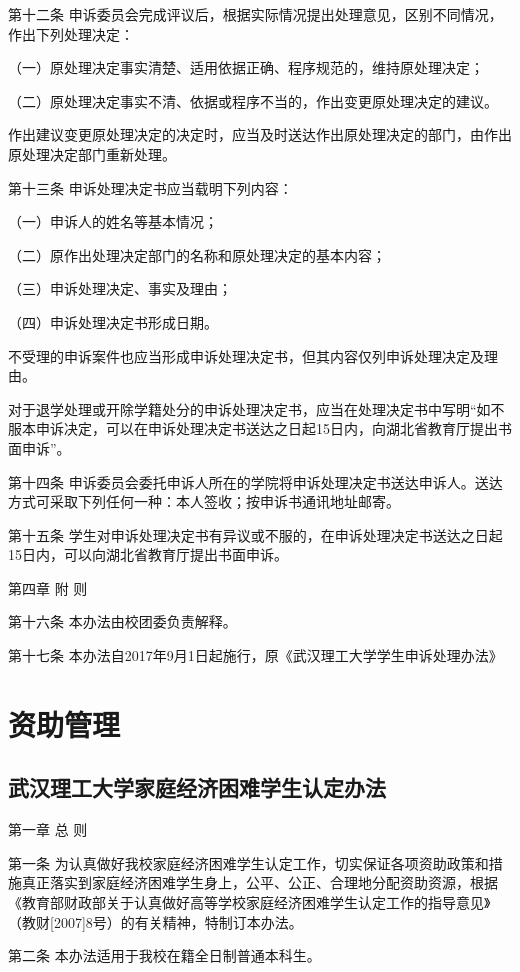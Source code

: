 \documentclass[UTF8,12pt,a4paper]{report}
\begin{document}
第十二条  申诉委员会完成评议后，根据实际情况提出处理意见，区别不同情况，作出下列处理决定：

（一）原处理决定事实清楚、适用依据正确、程序规范的，维持原处理决定；

（二）原处理决定事实不清、依据或程序不当的，作出变更原处理决定的建议。

作出建议变更原处理决定的决定时，应当及时送达作出原处理决定的部门，由作出原处理决定部门重新处理。

第十三条  申诉处理决定书应当载明下列内容：

（一）申诉人的姓名等基本情况；

（二）原作出处理决定部门的名称和原处理决定的基本内容；

（三）申诉处理决定、事实及理由；

（四）申诉处理决定书形成日期。

不受理的申诉案件也应当形成申诉处理决定书，但其内容仅列申诉处理决定及理由。

对于退学处理或开除学籍处分的申诉处理决定书，应当在处理决定书中写明“如不服本申诉决定，可以在申诉处理决定书送达之日起15日内，向湖北省教育厅提出书面申诉”。

第十四条  申诉委员会委托申诉人所在的学院将申诉处理决定书送达申诉人。送达方式可采取下列任何一种：本人签收；按申诉书通讯地址邮寄。

第十五条  学生对申诉处理决定书有异议或不服的，在申诉处理决定书送达之日起15日内，可以向湖北省教育厅提出书面申诉。



第四章  附 则

第十六条  本办法由校团委负责解释。

第十七条  本办法自2017年9月1日起施行，原《武汉理工大学学生申诉处理办法》

\part{资助管理}
\chapter{武汉理工大学家庭经济困难学生认定办法}
第一章 总 则

第一条 为认真做好我校家庭经济困难学生认定工作，切实保证各项资助政策和措施真正落实到家庭经济困难学生身上，公平、公正、合理地分配资助资源，根据《教育部财政部关于认真做好高等学校家庭经济困难学生认定工作的指导意见》（教财[2007]8号）的有关精神，特制订本办法。

第二条 本办法适用于我校在籍全日制普通本科生。
\end{document}
